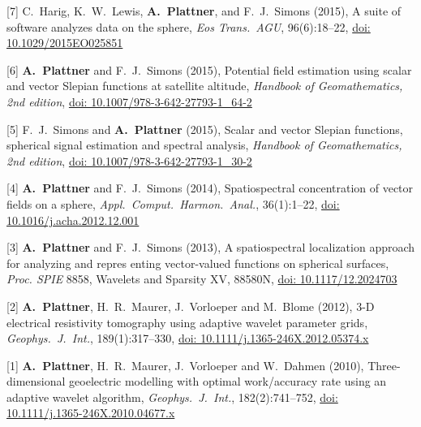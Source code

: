 \documentclass[10pt]{article}
\begin{document}
\spcp
\hspace{-0.5cm}[7] C.~Harig, K.~W.~Lewis, \textbf{A.~Plattner}, and F.~J.~Simons (2015),
A suite of software analyzes data on the sphere,
\emph{Eos Trans.~AGU}, 96(6):18--22,
\href{https://eos.org/project-updates/a-suite-of-software-analyzes-data-on-the-sphere-2}{doi: 10.1029/2015EO025851}

\spcp
\hspace{-0.5cm}[6] \textbf{A.~Plattner} and F.~J.~Simons (2015),
Potential field estimation using scalar and vector Slepian functions at satellite altitude,
\emph{Handbook of Geomathematics, 2nd edition},
\href{https://link.springer.com/referenceworkentry/10.1007\%2F978-3-642-27793-1_64-2}{doi: 10.1007/978-3-642-27793-1\_64-2}

\spcp
\hspace{-0.5cm}[5] F.~J.~Simons and \textbf{A.~Plattner} (2015),
Scalar and vector Slepian functions, spherical signal estimation and spectral analysis,
\emph{Handbook of Geomathematics, 2nd edition},
\href{https://link.springer.com/referenceworkentry/10.1007\%2F978-3-642-27793-1_30-2}{doi: 10.1007/978-3-642-27793-1\_30-2}

\spcp
\hspace{-0.5cm}[4] \textbf{A.~Plattner} and F.~J.~Simons (2014),
Spatiospectral concentration of vector fields on a sphere,
\emph{Appl.~Comput.~Harmon.~Anal.}, 36(1):1--22, 
\href{http://www.sciencedirect.com/science/article/pii/S106352031300002X?via\%3Dihub}{doi: 10.1016/j.acha.2012.12.001}

\spcp
\hspace{-0.5cm}[3] \textbf{A.~Plattner} and F.~J.~Simons (2013), 
A spatiospectral localization approach for analyzing and repres enting vector-valued functions on spherical surfaces,
\emph{Proc. SPIE} 8858, Wavelets and Sparsity XV, 88580N,
\href{http://proceedings.spiedigitallibrary.org/proceeding.aspx?articleid=1745029}{doi: 10.1117/12.2024703}

\spcp
\hspace{-0.5cm}[2] \textbf{A.~Plattner}, H.~R.~Maurer, J.~Vorloeper and M.~Blome (2012),
3-D electrical resistivity tomography using adaptive wavelet parameter grids,
\emph{Geophys.~J.~Int.}, 189(1):317--330,
\href{https://academic.oup.com/gji/article-lookup/doi/10.1111/j.1365-246X.2012.05374.x}{doi: 10.1111/j.1365-246X.2012.05374.x}

\spcp
\hspace{-0.5cm}[1] \textbf{A.~Plattner}, H.~R.~Maurer, J.~Vorloeper and W.~Dahmen (2010),
Three-dimensional geoelectric modelling with optimal work/accuracy rate 
using an adaptive wavelet algorithm,
\emph{Geophys.~J.~Int.}, 182(2):741--752,
\href{https://academic.oup.com/gji/article-lookup/doi/10.1111/j.1365-246X.2010.04677.x}{doi: 10.1111/j.1365-246X.2010.04677.x}
\end{document}
